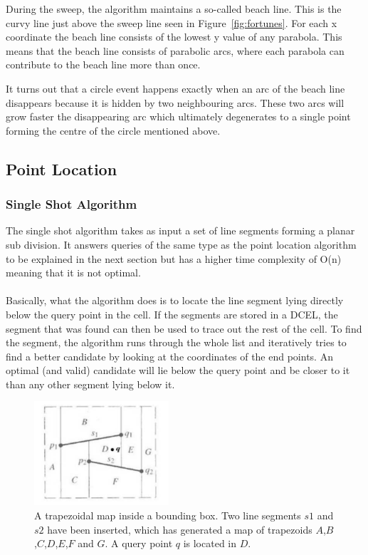 During the sweep, the algorithm maintains a so-called beach line. This is the curvy line just above the sweep line seen in Figure~\ref{fig:fortunes}. For each x coordinate the beach line consists of the lowest y value of any parabola. This means that the beach line consists of parabolic arcs, where each parabola can contribute to the beach line more than once.

It turns out that a circle event happens exactly when an arc of the beach line disappears because it is hidden by two neighbouring arcs. These two arcs will grow faster the disappearing arc which ultimately degenerates to a single point forming the centre of the circle mentioned above.

\subsection{Point Location}
\subsubsection{Single Shot Algorithm}
The single shot algorithm takes as input a set of line segments forming a planar sub division. It answers queries of the same type as the point location algorithm to be explained in the next section but has a higher time complexity of O(n) meaning that it is not optimal. 

\paragraph{}
Basically, what the algorithm does is to locate the line segment lying directly below the query point in the cell. If the segments are stored in a DCEL, the segment that was found can then be used to trace out the rest of the cell. To find the segment, the algorithm runs through the whole list and iteratively tries to find a better candidate by looking at the coordinates of the end points. An optimal (and valid) candidate will lie below the query point and be closer to it than any other segment lying below it. 

\begin{figure}[]
    \centering
      \includegraphics[width=50mm]{images/trapezoidal_map.pdf}
    \caption{A trapezoidal map inside a bounding box. Two line segments $s1$ and $s2$ have been inserted, which has generated a map of trapezoids $A$,$B$,$C$,$D$,$E$,$F$ and $G$. A query point $q$ is located in $D$.}
    \label{fig:trapezoidal_map}
\end{figure}

